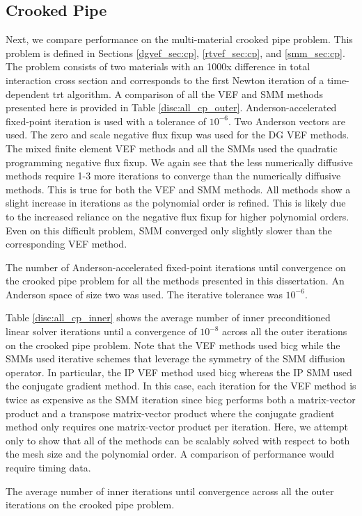 \documentclass[../doc.tex]{subfiles}
\begin{document}
\subsection{Crooked Pipe}
Next, we compare performance on the multi-material crooked pipe problem. This problem is defined in Sections \ref{dgvef_sec:cp}, \ref{rtvef_sec:cp}, and \ref{smm_sec:cp}. The problem consists of two materials with an 1000x difference in total interaction cross section and corresponds to the first Newton iteration of a time-dependent \gls{trt} algorithm. A comparison of all the VEF and SMM methods presented here is provided in Table \ref{disc:all_cp_outer}. Anderson-accelerated fixed-point iteration is used with a tolerance of $10^{-6}$. Two Anderson vectors are used. The zero and scale negative flux fixup was used for the DG VEF methods. The mixed finite element VEF methods and all the SMMs used the quadratic programming negative flux fixup. We again see that the less numerically diffusive methods require 1-3 more iterations to converge than the numerically diffusive methods. This is true for both the VEF and SMM methods. All methods show a slight increase in iterations as the polynomial order is refined. This is likely due to the increased reliance on the negative flux fixup for higher polynomial orders. 
Even on this difficult problem, SMM converged only slightly slower than the corresponding VEF method. 
\begin{table}
\centering
\caption{The number of Anderson-accelerated fixed-point iterations until convergence on the crooked pipe problem for all the methods presented in this dissertation. An Anderson space of size two was used. The iterative tolerance was $10^{-6}$. }
\label{disc:all_cp_outer}

\end{table}

Table \ref{disc:all_cp_inner} shows the average number of inner preconditioned linear solver iterations until a convergence of $10^{-8}$ across all the outer iterations on the crooked pipe problem. Note that the VEF methods used \gls{bicg} while the SMMs used iterative schemes that leverage the symmetry of the SMM diffusion operator. In particular, the IP VEF method used \gls{bicg} whereas the IP SMM used the conjugate gradient method. In this case, each iteration for the VEF method is twice as expensive as the SMM iteration since \gls{bicg} performs both a matrix-vector product and a transpose matrix-vector product where the conjugate gradient method only requires one matrix-vector product per iteration. Here, we attempt only to show that all of the methods can be scalably solved with respect to both the mesh size and the polynomial order. A comparison of performance would require timing data. 
\begin{table}
\centering
\caption{The average number of inner iterations until convergence across all the outer iterations on the crooked pipe problem. }
\label{disc:all_cp_inner}

\end{table}
\end{document}
